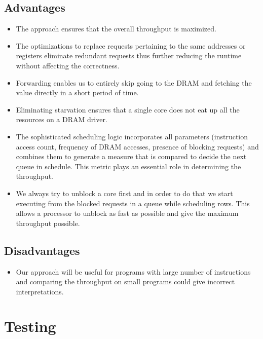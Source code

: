 \documentclass[hidelinks,12pt]{article}
\begin{document}
\subsection{Advantages}
\begin{itemize}
    \item The approach ensures that the overall throughput is maximized.
    \item The optimizations to replace requests pertaining to the same addresses or registers eliminate redundant requests thus further reducing the runtime without affecting the correctness.
    \item Forwarding enables us to entirely skip going to the DRAM and fetching the value directly in a short period of time.
    \item Eliminating starvation ensures that a single core does not eat up all the resources on a DRAM driver.
    \item The sophisticated scheduling logic incorporates all parameters (instruction access count, frequency of DRAM accesses, presence of blocking requests) and combines them to generate a measure that is compared to decide the next queue in schedule. This metric plays an essential role in determining the throughput.
    \item We always try to unblock a core first and in order to do that we start executing from the blocked requests in a queue while scheduling rows. This allows a processor to unblock as fast as possible and give the maximum throughput possible.
\end{itemize}
\subsection{Disadvantages}
\begin{itemize}
    \item Our approach will be useful for programs with large number of instructions and comparing the throughput on small programs could give incorrect interpretations.
\end{itemize}
\section{Testing}
\end{document}
